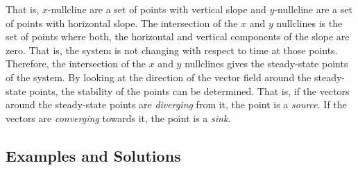 \documentclass[12pt,1in]{article}
\begin{document}
That is, $x$-nullcline are a set of points with vertical slope and $y$-nullcline are a set of points with horizontal slope. The intersection of the $x$ and $y$ nullclines is the set of points where both, the horizontal and vertical components of the slope are zero. That is, the system is not changing with respect to time at those points. Therefore, the intersection of the $x$ and $y$ nullclines gives the steady-state points of the system. By looking at the direction of the vector field around the steady-state points, the stability of the points can be determined. That is, if the vectors around the steady-state points are \emph{diverging} from it, the point is a \emph{source}. If the vectors are \emph{converging} towards it, the point is a \emph{sink}.  
\subsection{Examples and Solutions}
\end{document}
